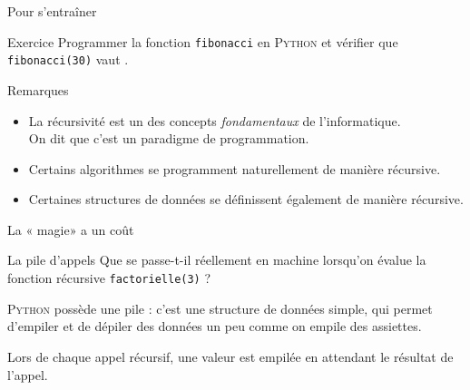 \documentclass[10pt]{nsibeamer}
\begin{document}
%

\begin{frame}{Pour s'entraîner}
    \begin{alertblock}{Exercice}
        Programmer la fonction  \texttt{fibonacci} en \textsc{Python} et vérifier que  \texttt{fibonacci(30)} vaut .
    \end{alertblock}
\end{frame}

%

\begin{frame}{Remarques}
    \begin{itemize}
        \item La récursivité est un des concepts \textit{fondamentaux} de l'informatique.\\\pause
              On dit que c'est un \alert{paradigme de programmation}.\pause
        \item Certains algorithmes se programment naturellement de manière récursive.\pause
        \item Certaines \alert{structures de données} se définissent également de manière récursive.
    \end{itemize}
\end{frame}

\begin{frame}[standout]
    \begin{center}
        \Huge
        La « magie» a un coût
    \end{center}
\end{frame}

%

\begin{frame}{La pile d'appels}
    Que se passe-t-il réellement en machine lorsqu'on évalue la fonction récursive \texttt{factorielle(3)} ?\\\pause
    
    \textsc{Python} possède une \alert{pile} : c'est une structure de données simple, qui permet d'empiler et de dépiler des données un peu comme on empile des assiettes.\\  \pause
    
    Lors de chaque appel récursif, une valeur est empilée en attendant le résultat de l'appel.
\end{frame}

%
\end{document}
